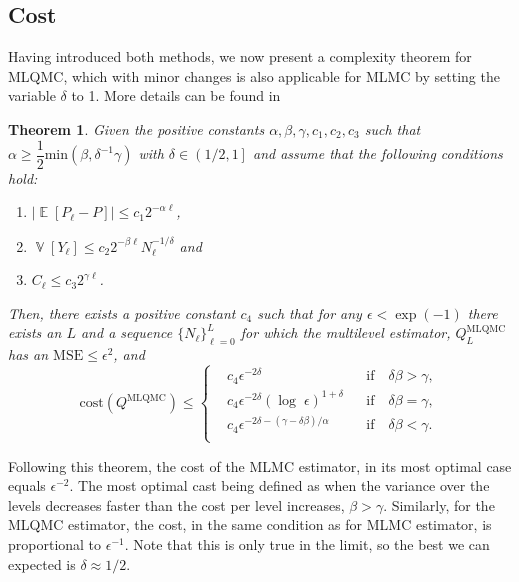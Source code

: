 \documentclass{ICASP13Paper}
\DeclareMathOperator{\E}{\mathbb{E}}
\DeclareMathOperator{\V}{\mathbb{V}}
\newtheorem{theorem}{Theorem}
\begin{document}
\subsection{Cost}
Having introduced both methods, we  now present a complexity theorem for MLQMC, which with minor changes is also applicable for MLMC by setting the variable $\delta$ to 1. More details can be found in \cite{Teckentrup}
\begin{theorem}
Given the  positive constants $\alpha, \beta, \gamma, c_1, c_2, c_3$ such that $\alpha \geq \dfrac{1}{2} \mathrm{min}\left(\beta,\delta^{-1}\gamma\right)$ with $\delta \in \left(1/2,1\right]$ and assume that the following conditions hold: 
\begin{enumerate}
\item $\lvert \E[P_{\ell} - P] \rvert \leq c_1 2^{-\alpha \ell}$,
\item $\V\left[Y_{\ell}\right] \leq  c_2 2^{-\beta \ell} N_{\ell}^{-1/\delta} $ \;and
\item $C_{\ell} \leq  c_3 2^{\gamma \ell}$.
\end{enumerate}

Then, there exists a positive constant $c_4$ such that for any $\epsilon < \exp(-1)$ there exists an  $L$ and  a sequence $\{N_{\ell}\}_{\ell=0}^L$ for which the multilevel estimator, $Q^{\mathrm{MLQMC}}_L$ has an $\mathrm{MSE}\leq\epsilon^2$, and
\begin{equation}
\mathrm{cost}(Q^{\mathrm{MLQMC}}) \leq    \left\{
  \begin{aligned}
& c_4 \epsilon^{-2 \delta} && \mathrm{if} \quad  \delta\beta > \gamma, \\
& c_4 \epsilon^{-2 \delta}\left(\log \;\epsilon \right)^{1+\delta} && \mathrm{if} \quad  \delta\beta = \gamma, \\
& c_4 \epsilon^{-2\delta-\left(\gamma-\delta\beta\right)/\alpha} && \mathrm{if} \quad  \delta\beta < \gamma. \\
  \end{aligned}
  \right.
  \label{eq:Algo_regime}
\end{equation}
\label{Theorem_1}
\end{theorem}
Following this theorem, the cost of the MLMC estimator, in its most optimal case  equals $\epsilon^{-2}$. The most optimal cast being defined as when the variance over the levels decreases faster than the cost per level increases, $\beta > \gamma$. Similarly, for the MLQMC estimator, the cost, in the same condition as for MLMC estimator, is proportional to $\epsilon^{-1}$. Note that this is only true in the limit, so the best we can expected is $\delta \approx 1/2$. 
\end{document}
